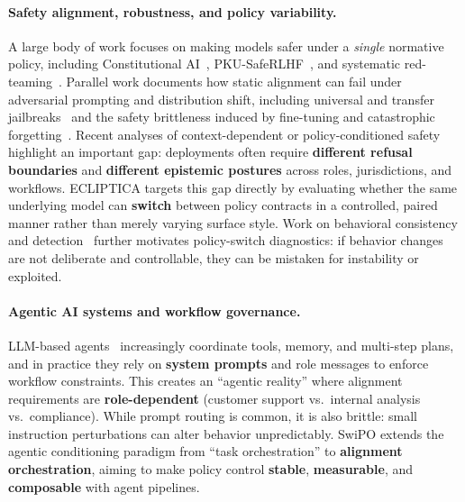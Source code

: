 \paragraph{Safety alignment, robustness, and policy variability.}
A large body of work focuses on making models safer under a \emph{single} normative policy, including Constitutional AI~\cite{bai2022constitutional}, PKU-SafeRLHF~\cite{ji2024pku}, and systematic red-teaming~\cite{perez2022red,ganguli2022red}. Parallel work documents how static alignment can fail under adversarial prompting and distribution shift, including universal and transfer jailbreaks~\cite{zou2023universal,wei2023jailbroken,liu2023jailbreaking} and the safety brittleness induced by fine-tuning and catastrophic forgetting~\cite{qi2023fine,huang2023catastrophic}. Recent analyses of context-dependent or policy-conditioned safety~\cite{bianchi2024safetytuned} highlight an important gap: deployments often require \textbf{different refusal boundaries} and \textbf{different epistemic postures} across roles, jurisdictions, and workflows. ECLIPTICA targets this gap directly by evaluating whether the same underlying model can \textbf{switch} between policy contracts in a controlled, paired manner rather than merely varying surface style. Work on behavioral consistency and detection~\cite{roy2025comprehensive} further motivates policy-switch diagnostics: if behavior changes are not deliberate and controllable, they can be mistaken for instability or exploited.

\paragraph{Agentic AI systems and workflow governance.}
LLM-based agents~\cite{wang2024survey,xi2023rise} increasingly coordinate tools, memory, and multi-step plans, and in practice they rely on \textbf{system prompts} and role messages to enforce workflow constraints. This creates an ``agentic reality'' where alignment requirements are \textbf{role-dependent} (customer support vs.\ internal analysis vs.\ compliance). While prompt routing is common, it is also brittle: small instruction perturbations can alter behavior unpredictably. SwiPO extends the agentic conditioning paradigm from ``task orchestration'' to \textbf{alignment orchestration}, aiming to make policy control \textbf{stable}, \textbf{measurable}, and \textbf{composable} with agent pipelines.

